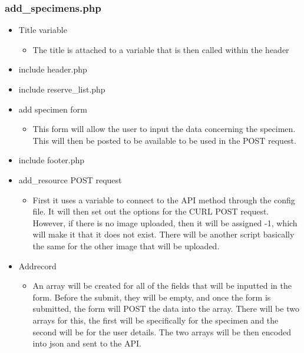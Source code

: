     \subsubsection{add\_specimens.php}
        \begin{itemize}
            \item Title variable
            \begin{itemize}
                \item The title is attached to a variable that is then called within the header
            \end{itemize}
            \item include header.php 
            \item include reserve\_list.php
            \item add specimen form
            \begin{itemize}
                \item This form will allow the user to input the data concerning the specimen. This will then be posted to be available to be used in the POST request.
            \end{itemize}
            \item include footer.php
            \item add\_resource POST request
            \begin{itemize}
                \item First it uses a variable to connect to the API method through the config file. It will then set out the options for the CURL POST request. However, if there is no image uploaded, then it will be assigned -1, which will make it that it does not exist. There will be another script basically the same for the other image that will be uploaded.
            \end{itemize}
            \item Addrecord
            \begin{itemize}
                \item An array will be created for all of the fields that will be inputted in the form. Before the submit, they will be empty, and once the form is submitted, the form will POST the data into the array. There will be two arrays for this, the first will be specifically for the specimen and the second will be for the user details. The two arrays will be then encoded into json and sent to the API.
            \end{itemize}
        \end{itemize}
        
